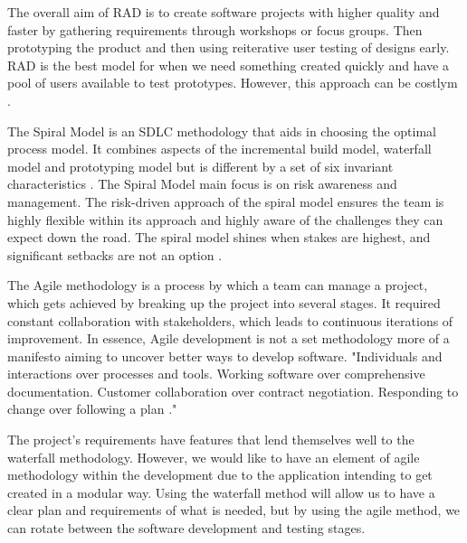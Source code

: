 	The overall aim of RAD is to create software projects with higher quality and faster by gathering requirements through workshops or focus groups. Then prototyping the product and then using reiterative user testing of designs early. RAD is the best model for when we need something created quickly and have a pool of users available to test prototypes. However, this approach can be costlym \cite{cscm01slides}. 
	
	The Spiral Model is an SDLC methodology that aids in choosing the optimal process model. It combines aspects of the incremental build model, waterfall model and prototyping model but is different by a set of six invariant characteristics \cite{spiralmodel}. The Spiral Model main focus is on risk awareness and management. The risk-driven approach of the spiral model ensures the team is highly flexible within its approach and highly aware of the challenges they can expect down the road. The spiral model shines when stakes are highest, and significant setbacks are not an option \cite{spiralmodel}.
	
	
	The Agile methodology is a process by which a team can manage a project, which gets achieved by breaking up the project into several stages. It required constant collaboration with stakeholders, which leads to continuous iterations of improvement. In essence, Agile development is not a set methodology more of a manifesto aiming to uncover better ways to develop software. "Individuals and interactions over processes and tools. Working software over comprehensive documentation. Customer collaboration over contract negotiation. Responding to change over following a plan \cite{agilemanifesto}."
	
	The project's requirements have features that lend themselves well to the waterfall methodology. However, we would like to have an element of agile methodology within the development due to the application intending to get created in a modular way. Using the waterfall method will allow us to have a clear plan and requirements of what is needed, but by using the agile method, we can rotate between the software development and testing stages.
	
